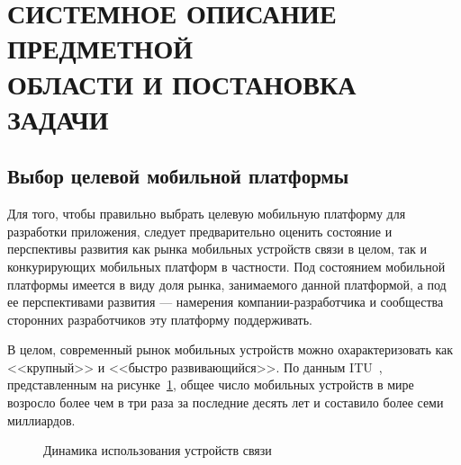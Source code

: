 \section[Системное описание предметной области и постановка задачи]{%
  СИСТЕМНОЕ ОПИСАНИЕ ПРЕДМЕТНОЙ \\
  ОБЛАСТИ И ПОСТАНОВКА ЗАДАЧИ
}\label{sec:system_spec}

\subsection{Выбор целевой мобильной платформы}

Для того, чтобы правильно выбрать целевую мобильную платформу
для разработки приложения, следует предварительно оценить состояние
и перспективы развития как рынка мобильных устройств связи в целом,
так и конкурирующих мобильных платформ в частности.
Под состоянием мобильной платформы имеется в виду
доля рынка, занимаемого данной платформой,
а под ее перспективами развития --- намерения компании-разработчика и
сообщества сторонних разработчиков эту платформу поддерживать.

В целом, современный рынок мобильных устройств можно охарактеризовать
как <<крупный>> и <<быстро развивающийся>>.
По данным ITU~\cite{itu_stat_phone}, представленным на
рисунке~\ref{fig:system_spec_stat_phones},
общее число мобильных устройств в мире возросло
более чем в три раза за последние десять лет
и составило более семи миллиардов.

\begin{figure}[h!]
  \centering
  \caption{Динамика использования устройств связи}
  \label{fig:system_spec_stat_phones}
\end{figure}

